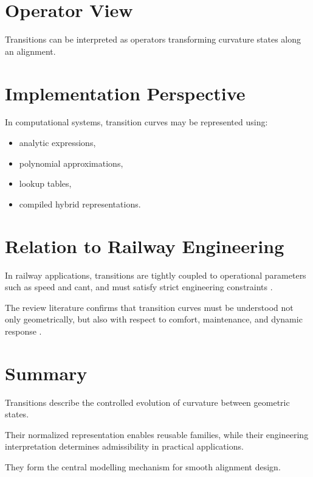 \section{Operator View}

\begin{remark}
Transitions can be interpreted as operators transforming curvature
states along an alignment.
\end{remark}


\section{Implementation Perspective}

\begin{remark}
In computational systems, transition curves may be represented using:
\begin{itemize}
\item analytic expressions,
\item polynomial approximations,
\item lookup tables,
\item compiled hybrid representations.
\end{itemize}
\end{remark}



\section{Relation to Railway Engineering}

\begin{remark}
In railway applications, transitions are tightly coupled to operational
parameters such as speed and cant, and must satisfy strict engineering
constraints \cite{Kufver2000RailwayAlignment,Klein1998Trassierung}.
\end{remark}

\begin{remark}
The review literature confirms that transition curves must be understood
not only geometrically, but also with respect to comfort, maintenance,
and dynamic response \cite{Review2020TransitionCurves}.
\end{remark}

\section{Summary}

\begin{summary}
Transitions describe the controlled evolution of curvature between
geometric states.

Their normalized representation enables reusable families, while their
engineering interpretation determines admissibility in practical
applications.

They form the central modelling mechanism for smooth alignment design.
\end{summary}
